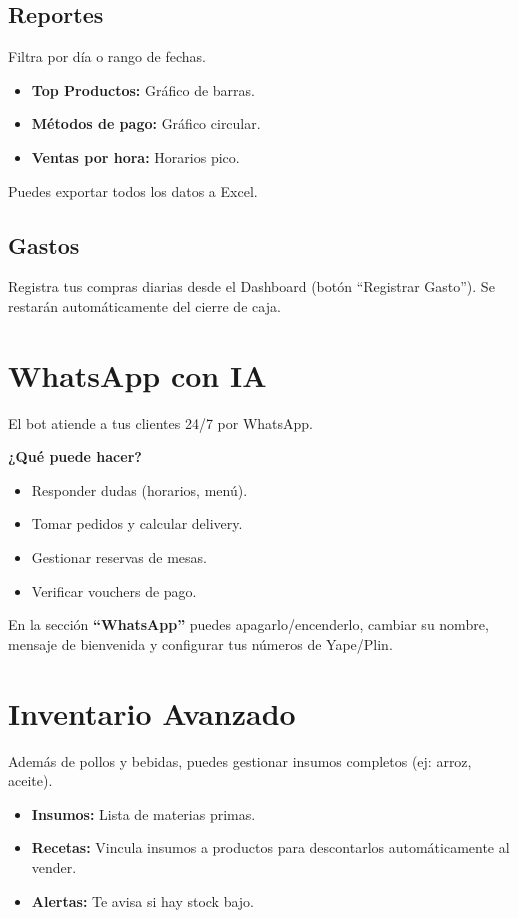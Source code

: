 \documentclass[10pt,a4paper,twoside]{article}
\begin{document}
\subsection{Reportes}
Filtra por día o rango de fechas.
\begin{itemize}[itemsep=1pt, leftmargin=15pt]
    \item \textbf{Top Productos:} Gráfico de barras.
    \item \textbf{Métodos de pago:} Gráfico circular.
    \item \textbf{Ventas por hora:} Horarios pico.
\end{itemize}
Puedes exportar todos los datos a Excel.

\subsection{Gastos}
Registra tus compras diarias desde el Dashboard (botón ``Registrar Gasto''). Se restarán automáticamente del cierre de caja.

\section{WhatsApp con IA}

El bot atiende a tus clientes 24/7 por WhatsApp.

\textbf{¿Qué puede hacer?}
\begin{itemize}[itemsep=1pt, leftmargin=15pt]
    \item Responder dudas (horarios, menú).
    \item Tomar pedidos y calcular delivery.
    \item Gestionar reservas de mesas.
    \item Verificar vouchers de pago.
\end{itemize}

En la sección \textbf{``WhatsApp''} puedes apagarlo/encenderlo, cambiar su nombre, mensaje de bienvenida y configurar tus números de Yape/Plin.

\section{Inventario Avanzado}

Además de pollos y bebidas, puedes gestionar insumos completos (ej: arroz, aceite).
\begin{itemize}[itemsep=1pt, leftmargin=15pt]
    \item \textbf{Insumos:} Lista de materias primas.
    \item \textbf{Recetas:} Vincula insumos a productos para descontarlos automáticamente al vender.
    \item \textbf{Alertas:} Te avisa si hay stock bajo.
\end{itemize}
\end{document}
